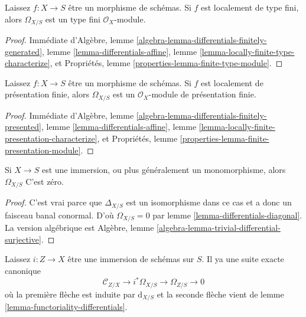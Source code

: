 \begin{lemma}

\label{lemma-finite-type-differentials}
Laissez $f : X \to S$ être un morphisme de schémas. Si $f$ est localement de type fini, alors $\Omega_{X/S}$ est un type fini $\mathcal{O}_X$-module.
\end{lemma}

\begin{proof}
Immédiate d'Algèbre, lemme \ref{algebra-lemma-differentials-finitely-generated}, lemme \ref{lemma-differentials-affine}, lemme \ref{lemma-locally-finite-type-characterize}, et Propriétés, lemme \ref{properties-lemma-finite-type-module}.
\end{proof}

\begin{lemma}

\label{lemma-finite-presentation-differentials}
Laissez $f : X \to S$ être un morphisme de schémas. Si $f$ est localement de présentation finie, alors $\Omega_{X/S}$ est un $\mathcal{O}_X$-module de présentation finie.
\end{lemma}

\begin{proof}
Immédiate d'Algèbre, lemme \ref{algebra-lemma-differentials-finitely-presented}, lemme \ref{lemma-differentials-affine}, lemme \ref{lemma-locally-finite-presentation-characterize}, et Propriétés, lemme \ref{properties-lemma-finite-presentation-module}.
\end{proof}

\begin{lemma}

\label{lemma-immersion-differentials}

Si $X \to S$ est une immersion, ou plus généralement un monomorphisme, alors
$\Omega_{X/S}$ C'est zéro.

\end{lemma}

\begin{proof}
C'est vrai parce que $\Delta_{X/S}$ est un isomorphisme dans ce cas et a donc un faisceau banal conormal. D'où $\Omega_{X/S} = 0$ par lemme \ref{lemma-differentials-diagonal}. La version algébrique est Algèbre, lemme \ref{algebra-lemma-trivial-differential-surjective}.
\end{proof}

\begin{lemma}

\label{lemma-differentials-relative-immersion}
Laissez $i : Z \to X$ être une immersion de schémas sur $S$. Il ya une suite exacte canonique $$
\mathcal{C}_{Z/X} \to i^*\Omega_{X/S} \to \Omega_{Z/S} \to 0
$$ où la première flèche est induite par $\text{d}_{X/S}$ et la seconde flèche vient de lemme \ref{lemma-functoriality-differentials}.
\end{lemma}

